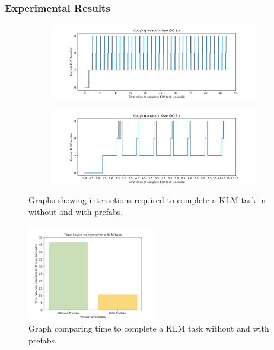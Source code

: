 \documentclass[11pt]{article}
\begin{document}
		\subsubsection{Experimental Results}
			\begin{figure}
				\centering	
				\begin{subfigure}[b]{\textwidth}
					\centering
					\includegraphics[width=\textwidth]{results/opendc1.png}
					\caption{\label{fig:opendcklm1}}
				\end{subfigure}
				\vfill
				\begin{subfigure}[b]{\textwidth}
					\centering
					\includegraphics[width=\textwidth]{results/opendc2.png}
					\caption{\label{fig:opendcklm2}}
				\end{subfigure}
				\caption[Graphs showing interactions required to complete a KLM task in \opendc{} without and with our extensions]{Graphs showing interactions required to complete a KLM task in \opendc{} without and with prefabs.}
				\label{fig:opendcklm}
			\end{figure}
			\begin{figure}[]
				\centering
				\includegraphics[width=0.5\textwidth]{results/klmbarcharts.png}
				\caption[Graph comparing time to complete a KLM task in two variants of \opendc{}]{Graph comparing time to complete a KLM task without and with prefabs.}
				\label{fig:opendcbarchart}
			\end{figure}
\end{document}
